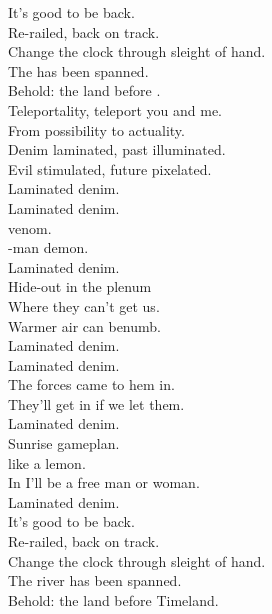 
\label{album:laminated-denim}





It's good to be back. \\
Re-railed, back on track. \\
Change the clock through sleight of hand. \\
The  has been spanned. \\
Behold: the land before . \\

Teleportality, teleport you and me. \\
From possibility to actuality. \\
Denim laminated, past illuminated. \\
Evil stimulated, future pixelated. \\

Laminated denim. \\

Laminated denim. \\
 venom. \\
-man demon. \\
Laminated denim. \\
Hide-out in the plenum \\
Where they can't get us. \\
Warmer air can benumb. \\
Laminated denim. \\

Laminated denim. \\
The forces came to hem in. \\
They'll get in if we let them. \\
Laminated denim. \\
Sunrise gameplan. \\
 like a lemon. \\
In  I'll be a free man or woman. \\
Laminated denim. \\

It's good to be back. \\
Re-railed, back on track. \\
Change the clock through sleight of hand. \\
The river has been spanned. \\
Behold: the land before Timeland. \\

